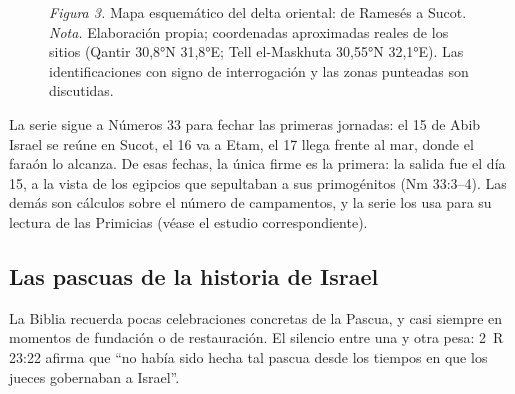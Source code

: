 \documentclass[11pt,letterpaper]{article}
\begin{document}
\begin{figure}[!htbp]
\par
{\footnotesize\color{sepia}\textit{Figura 3.} Mapa esquemático del delta oriental: de Ramesés a Sucot. \textit{Nota.} Elaboración propia; coordenadas aproximadas reales de los sitios (Qantir 30,8°N 31,8°E; Tell el-Maskhuta 30,55°N 32,1°E). Las identificaciones con signo de interrogación y las zonas punteadas son discutidas.}
\end{figure}

La serie sigue a Números 33 para fechar las primeras jornadas: el 15 de Abib Israel se reúne en Sucot, el 16 va a Etam, el 17 llega frente al mar, donde el faraón lo alcanza. De esas fechas, la única firme es la primera: la salida fue el día 15, a la vista de los egipcios que sepultaban a sus primogénitos (Nm 33:3--4). Las demás son cálculos sobre el número de campamentos, y la serie los usa para su lectura de las Primicias (véase el estudio correspondiente).

\subsection{Las pascuas de la historia de Israel}
La Biblia recuerda pocas celebraciones concretas de la Pascua, y casi siempre en momentos de fundación o de restauración. El silencio entre una y otra pesa: 2~R 23:22 afirma que ``no había sido hecha tal pascua desde los tiempos en que los jueces gobernaban a Israel''.
\end{document}
